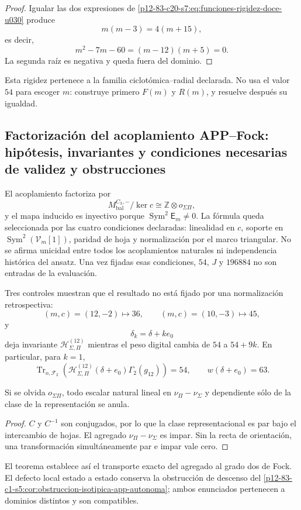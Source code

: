 \begin{proof}
Igualar las dos expresiones de
\eqref{p12-83-c20-s7:eq:funciones-rigidez-doce-u030} produce
\[
 m(m-3)=4(m+15),
\]
es decir,
\[
 m^2-7m-60=(m-12)(m+5)=0.
\]
La segunda raíz es negativa y queda fuera del dominio.
\end{proof}

Esta rigidez pertenece a la familia ciclotómica--radial declarada. No usa el
valor \(54\) para escoger \(m\): construye primero \(F(m)\) y \(R(m)\), y
resuelve después su igualdad.

\subsection{Factorización del acoplamiento APP–Fock: hipótesis, invariantes y condiciones necesarias de validez y obstrucciones}

El acoplamiento factoriza por
\[
M_{\mathrm{bal}}^{C_3,-}/\ker c
\cong\mathbb Z\otimes o_{\Sigma\Pi},
\]
y el mapa inducido es inyectivo porque
\(\operatorname{Sym}^2\mathsf E_m\neq0\).
La fórmula queda seleccionada por las cuatro condiciones declaradas:
linealidad en \(c\), soporte en
\(\operatorname{Sym}^2(\mathcal V_m[1])\), paridad
de hoja y normalización por el marco triangular. No se afirma unicidad
entre todos los acoplamientos naturales ni independencia histórica del
ansatz. Una vez fijadas esas condiciones, \(54\), \(J\) y \(196884\) no
son entradas de la evaluación.

Tres controles muestran que el resultado no está fijado por una
normalización retrospectiva:
\[
(m,c)=(12,-2)\longmapsto36,\qquad
(m,c)=(10,-3)\longmapsto45,
\]
y
\[
\delta_k=\delta+ke_0
\]
deja invariante \(\mathcal H_{\Sigma,\Pi}^{(12)}\) mientras el peso digital
cambia de \(54\) a \(54+9k\). En particular, para \(k=1\),
\[
\operatorname{Tr}_{o,\mathcal F_2}
\left(
\mathcal H_{\Sigma,\Pi}^{(12)}(\delta+e_0)\Gamma_2(g_{12})
\right)=54,
\qquad
w(\delta+e_0)=63.
\]

\begin{proposition}
\label{p12-83-c20-s7:prop:orientacion-app-fock}
Si se olvida \(o_{\Sigma\Pi}\), todo escalar natural lineal en
\(\nu_\Pi-\nu_\Sigma\) y dependiente sólo de la clase de la representación
se anula.
\end{proposition}

\begin{proof}
\(C\) y \(C^{-1}\) son conjugados, por lo que la clase representacional es
par bajo el intercambio de hojas. El agregado
\(\nu_\Pi-\nu_\Sigma\) es impar. Sin la recta de orientación, una
transformación simultáneamente par e impar vale cero.
\end{proof}

El teorema establece así el transporte exacto del agregado al grado dos de
Fock. El defecto local estado a estado conserva la obstrucción de descenso
del \cref{p12-83-c1-s5:cor:obstruccion-isotipica-app-autonoma}; ambos enunciados pertenecen a
dominios distintos y son compatibles.


